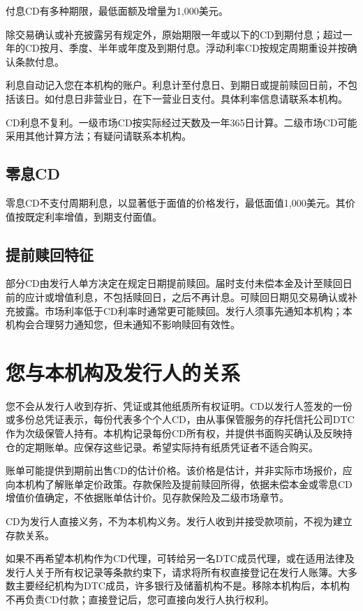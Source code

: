 \documentclass[UTF8,fontset=none,11pt,a4paper]{ctexart}
\begin{document}
付息CD有多种期限，最低面额及增量为1,000美元。


除交易确认或补充披露另有规定外，原始期限一年或以下的CD到期付息；超过一年的CD按月、季度、半年或年度及到期付息。浮动利率CD按规定周期重设并按确认条款付息。


利息自动记入您在本机构的账户。利息计至付息日、到期日或提前赎回日前，不包括该日。如付息日非营业日，在下一营业日支付。具体利率信息请联系本机构。


CD利息不复利。一级市场CD按实际经过天数及一年365日计算。二级市场CD可能采用其他计算方法；有疑问请联系本机构。


\subsection*{零息CD}
零息CD不支付周期利息，以显著低于面值的价格发行，最低面值1,000美元。其价值按既定利率增值，到期支付面值。


\subsection*{提前赎回特征}
部分CD由发行人单方决定在规定日期提前赎回。届时支付未偿本金及计至赎回日前的应计或增值利息，不包括赎回日，之后不再计息。可赎回日期见交易确认或补充披露。市场利率低于CD利率时通常更可能赎回。发行人须事先通知本机构；本机构会合理努力通知您，但未通知不影响赎回有效性。


\section*{您与本机构及发行人的关系}
您不会从发行人收到存折、凭证或其他纸质所有权证明。CD以发行人签发的一份或多份总凭证表示，每份代表多个个人CD，由从事保管服务的存托信托公司DTC作为次级保管人持有。本机构记录每份CD所有权，并提供书面购买确认及反映持仓的定期账单。应保存这些记录。希望实际持有纸质凭证者不适合购买。


账单可能提供到期前出售CD的估计价格。该价格是估计，并非实际市场报价，应向本机构了解账单定价政策。存款保险及提前赎回所得，依据未偿本金或零息CD增值价值确定，不依据账单估计价。见存款保险及二级市场章节。


CD为发行人直接义务，不为本机构义务。发行人收到并接受款项前，不视为建立存款关系。


如果不再希望本机构作为CD代理，可转给另一名DTC成员代理，或在适用法律及发行人关于所有权记录等条款约束下，请求将所有权直接登记在发行人账簿。大多数主要经纪机构为DTC成员，许多银行及储蓄机构不是。移除本机构后，本机构不再负责CD付款；直接登记后，您可直接向发行人执行权利。
\end{document}

